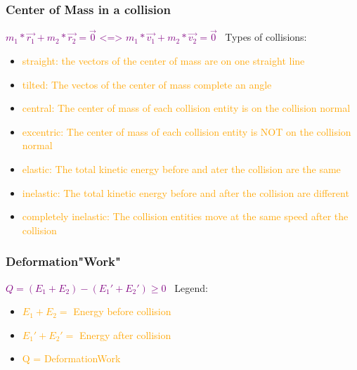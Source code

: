 \documentclass[main.tex,fontsize=8pt,paper=a4,paper=portrait,DIV=calc,]{scrartcl}
\begin{document}
\begin{multicols*}{2}
\subsubsection{Center of Mass in a collision}
\vspace{2mm}
\large \textcolor{purple}{\( m_1 * \vec{r_1} + m_2 * \vec{r_2} = \vec{0} \text{ <=> } m_1*\vec{v_1} + m_2 * \vec{v_2} = \vec{0} \)}\newline
\normalsize \, \newline
Types of collisions:\newline
\begin{itemize}
\item \textcolor{orange}{straight: the vectors of the center of mass are on one straight line}
\item \textcolor{orange}{tilted: The vectos of the center of mass complete an angle}
\item \textcolor{orange}{central: The center of mass of each collision entity is on the collision normal}
\item \textcolor{orange}{excentric: The center of mass of each collision entity is NOT on the collision normal }
\item \textcolor{orange}{elastic: The total kinetic energy before and ater the collision are the same}
\item \textcolor{orange}{inelastic: The total kinetic energy before and after the collision are different}
\item \textcolor{orange}{completely inelastic: The collision entities move at the same speed after the collision}
\end{itemize} 

\subsubsection{Deformation"Work"}
\vspace{2mm}
\large \textcolor{purple}{\( Q = (E_1 + E_2) - (E_1' + E_2') \geq 0 \)}\newline
\normalsize \, \newline
Legend:\newline
\begin{itemize}
\item \textcolor{orange}{\( E_1 + E_2 =\) Energy before collision}
\item \textcolor{orange}{\( E_1' + E_2' =\) Energy after collision}
\item \textcolor{orange}{Q = DeformationWork}
\end{itemize} 


\end{multicols*}
\end{document}
